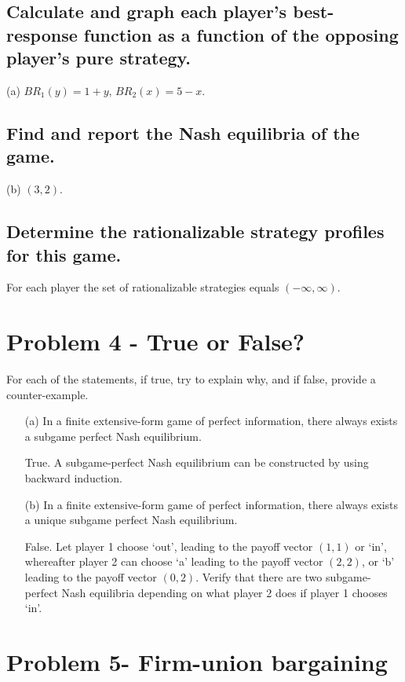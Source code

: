 \documentclass{article}
\begin{document}
\subsection{Calculate and graph each player’s best-response function as a function
of the opposing player’s pure strategy.}
(a) $BR_1(y) = 1+y$, $BR_2(x) = 5-x$.
\subsection{Find and report the Nash equilibria of the game.}
(b) $(3,2)$.
\subsection{Determine the rationalizable strategy profiles for this game.}

For each player the set of rationalizable strategies equals $(-\infty, \infty)$.

\bigskip

\section{Problem 4 - True or False?}

For each of the statements, if true, try to explain why, and if false, provide a
counter-example.
%
%
\begin{itemize}
%
\item[(a)] In a finite extensive-form game of perfect information, there always exists a subgame perfect
Nash equilibrium. 

 True. A subgame-perfect Nash equilibrium can be constructed by using backward induction.
%
\item[(b)] In a finite extensive-form game of perfect information, there always exists a unique subgame perfect Nash equilibrium. 

False. Let player 1 choose `out', leading to the payoff vector $(1,1)$ or `in', whereafter player 2 can choose `a' leading to the payoff vector $(2,2)$, or `b' leading to the payoff vector $(0,2)$. Verify that there are two subgame-perfect Nash equilibria depending on what player 2 does if player 1 chooses `in'.
%
\end{itemize}
\vspace{-6pt}

\bigskip

\section{Problem 5- Firm-union bargaining}
\end{document}
